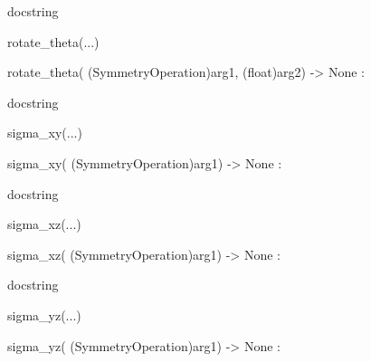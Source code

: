 \documentclass[letterpaper,10pt,english]{sphinxmanual}
\begin{document}
\begin{description}
\begin{description}
\begin{DUlineblock}{0em}
\begin{DUlineblock}{\DUlineblockindent}
\begin{DUlineblock}{\DUlineblockindent}
\item[] docstring
\item[] 
\end{DUlineblock}
\end{DUlineblock}
\item[] rotate\_theta(...)
\item[]
\begin{DUlineblock}{\DUlineblockindent}
\item[] rotate\_theta( (SymmetryOperation)arg1, (float)arg2) -\textgreater{} None :
\item[]
\begin{DUlineblock}{\DUlineblockindent}
\item[] docstring
\item[] 
\end{DUlineblock}
\end{DUlineblock}
\item[] sigma\_xy(...)
\item[]
\begin{DUlineblock}{\DUlineblockindent}
\item[] sigma\_xy( (SymmetryOperation)arg1) -\textgreater{} None :
\item[]
\begin{DUlineblock}{\DUlineblockindent}
\item[] docstring
\item[] 
\end{DUlineblock}
\end{DUlineblock}
\item[] sigma\_xz(...)
\item[]
\begin{DUlineblock}{\DUlineblockindent}
\item[] sigma\_xz( (SymmetryOperation)arg1) -\textgreater{} None :
\item[]
\begin{DUlineblock}{\DUlineblockindent}
\item[] docstring
\item[] 
\end{DUlineblock}
\end{DUlineblock}
\item[] sigma\_yz(...)
\item[]
\begin{DUlineblock}{\DUlineblockindent}
\item[] sigma\_yz( (SymmetryOperation)arg1) -\textgreater{} None :
\item[]

\end{DUlineblock}
\end{DUlineblock}
\end{description}
\end{description}
\end{document}
